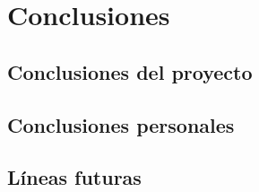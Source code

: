 \chapter{Conclusiones}
\label{ch:conclusiones}
\section{Conclusiones del proyecto}

\section{Conclusiones personales}

\section{Líneas futuras}